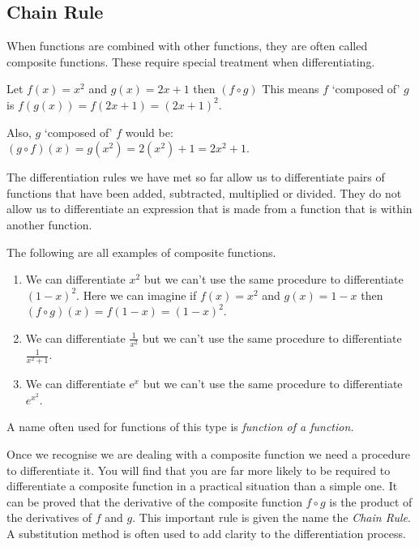 \subsection{Chain Rule}
When functions are combined with other functions, they are often called composite functions. These require special treatment when differentiating.

Let $f (x) =x^{2}$ and $g (x) =2 x +1$ then $\left (f \circ g\right )$ This means $f$ `composed of' $g$ is $f \left (g \left (x\right )\right ) =f (2 x +1) =\left (2 x +1\right )^{2}$. 

Also, $g$ `composed of' $f$ would be: $\left (g \circ f\right ) (x) =g \left (x^{2}\right ) =2 \left (x^{2}\right ) +1 =2 x^{2} +1$. 

The differentiation rules we have met so far allow us to differentiate pairs of functions that have been added, subtracted, multiplied or divided. They do not allow us to differentiate an expression that is made from a function that is within another function.

The following are all examples of composite functions. 
\begin{enumerate}
\item We can differentiate $x^{2}$ but we can't use the same procedure to differentiate $\left (1 -x\right )^{2}$. Here we can imagine if  $f (x) =x^{2}$ and $g (x) =1 -x$ then $\left (f \circ g\right ) (x) =f (1 -x) =\left (1 -x\right )^{2}$.

\item We can differentiate $\frac{1}{x^{2}}$ but we can't use the same procedure to differentiate $\frac{1}{x^{2} +1}$. 

\item We can differentiate e$^{x}$ but we can't use the same procedure to differentiate $e^{x^{2}}$. 
\end{enumerate}

A name often used for functions of this type is \emph{function of a function.} 

Once we recognise we are dealing with a composite function we need a procedure to differentiate it. You will find that you are far more likely to be required to differentiate a composite function in a practical situation than a simple one. It can be proved that the derivative of the composite function $f \circ g$ is the product of the derivatives of $f$ and $g$. This important rule is given the name the \emph{Chain Rule}. A substitution method is often used to add clarity to the differentiation process. 

